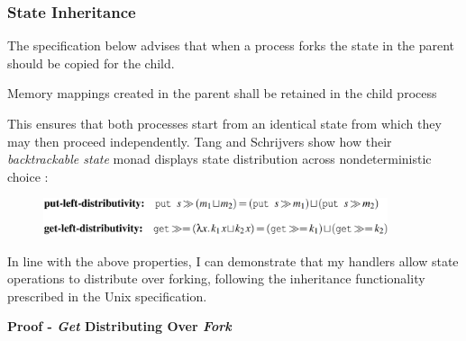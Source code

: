 \documentclass[logo,bsc,singlespacing,parskip]{infthesis}
\begin{document}
\subsubsection{State Inheritance} 
The specification below advises that when a process forks the state in the parent should be copied for the child.
\begin{tcolorbox}[colback=gray!10, colframe=gray!60, sharp corners, boxrule=0.5pt, title={POSIX Base Specifications, Issue 7, p.897}]
Memory mappings created in the parent shall be retained in the child process
\end{tcolorbox}
 This ensures that both processes start from an identical state from which they may then proceed independently. Tang and Schrijvers  show how their \textit{backtrackable state} monad displays state distribution across nondeterministic choice \cite{tang2025high} :


\begin{figure}[H]  %
  \centering
  \includegraphics[width=0.9\textwidth]{distributivity.png}  %
  
\end{figure}

In line with the above properties, I can demonstrate that my handlers allow state operations to distribute over forking, following the inheritance functionality prescribed in the Unix specification. 


{\large{\textbf{Proof - \textit{Get} Distributing Over \textit{Fork}}}}
\end{document}
